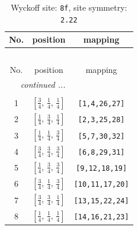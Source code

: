 \documentclass[fleqn,8pt]{jsarticle}
\begin{document}
\begin{longtable}{ccc}
\caption{Wyckoff site: {\tt 8f}, site symmetry: {\tt 2.22}}
 \\
 \hline \hline
No. & position & mapping \\ \hline \endfirsthead

\multicolumn{2}{l}{\tablename\ \thetable{}} \\
 \hline \hline
No. & position & mapping \\ \hline \endhead

 \hline \hline
\multicolumn{2}{r}{\footnotesize\it continued ...} \\ \endfoot

 \hline \hline
\multicolumn{2}{r}{} \\ \endlastfoot

1 & $\left[ \frac{3}{4},\, \frac{1}{4},\, \frac{1}{4} \right]$ & {\tt [1,4,26,27]} \\ \hline
2 & $\left[ \frac{1}{4},\, \frac{3}{4},\, \frac{1}{4} \right]$ & {\tt [2,3,25,28]} \\ \hline
3 & $\left[ \frac{1}{4},\, \frac{1}{4},\, \frac{3}{4} \right]$ & {\tt [5,7,30,32]} \\ \hline
4 & $\left[ \frac{3}{4},\, \frac{3}{4},\, \frac{3}{4} \right]$ & {\tt [6,8,29,31]} \\ \hline
5 & $\left[ \frac{1}{4},\, \frac{3}{4},\, \frac{3}{4} \right]$ & {\tt [9,12,18,19]} \\ \hline
6 & $\left[ \frac{3}{4},\, \frac{1}{4},\, \frac{3}{4} \right]$ & {\tt [10,11,17,20]} \\ \hline
7 & $\left[ \frac{3}{4},\, \frac{3}{4},\, \frac{1}{4} \right]$ & {\tt [13,15,22,24]} \\ \hline
8 & $\left[ \frac{1}{4},\, \frac{1}{4},\, \frac{1}{4} \right]$ & {\tt [14,16,21,23]} \\
\end{longtable}
\renewcommand{\arraystretch}{1.2}
\end{document}
